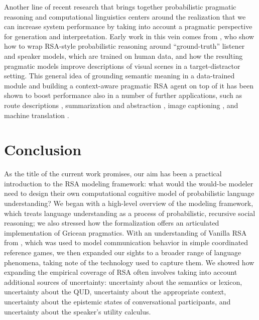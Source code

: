 \documentclass[10pt,letterpaper]{article}
\newcommand{\mf}[1]{\textcolor{orange}{[mf: #1]}}
\newcommand{\mht}[1]{\textcolor{purple}{[mht: #1]}}
\begin{document}
Another line of recent research that brings together probabilistic pragmatic reasoning and computational linguistics centers around the realization that we can increase system performance by taking into account a pragmatic perspective for generation and interpretation.
Early work in this vein comes from \cite{AndreasKlein2016:Reasoning-about}, who show how to wrap RSA-style probabilistic reasoning around ``ground-truth'' listener and speaker models, which are trained on human data, and how the resulting pragmatic models improve descriptions of visual scenes in a target-distractor setting.
This general idea of grounding semantic meaning in a data-trained module and building a context-aware pragmatic RSA agent on top of it has been shown to boost performance also in a number of further applications, such as route descriptions \cite{FriedHu2018:Speaker-Followe}, summarization and abstraction \cite{ShenFried2019:Pragmatically-I}, image captioning \cite{Cohn-GordonGoodman2018:Pragmatically-I,NieCohn-Gordon2020:Pragmatic-Issue}, and machine translation \cite{Cohn-GordonGoodman2019:Lost-in-Machine}.



\section*{Conclusion} \label{summary}

As the title of the current work promises, our aim has been a practical introduction to the RSA modeling framework: what would the would-be modeler need to design their own computational cognitive model of probabilistic language understanding? We began with a high-level overview of the modeling framework, which treats language understanding as a process of probabilistic, recursive social reasoning; we also stressed how the formalization offers an articulated implementation of Gricean pragmatics. With an understanding of Vanilla RSA from \cite{frankgoodman2012}, which was used to model communication behavior in simple coordinated reference games, we then expanded our sights to a broader range of language phenomena, taking note of the technology used to capture them. We showed how expanding the empirical coverage of RSA often involves taking into account additional sources of uncertainty: uncertainty about the semantics or lexicon, uncertainty about the QUD, uncertainty about the appropriate context, uncertainty about the epistemic states of conversational participants, and uncertainty about the speaker's utility calculus.
\end{document}
